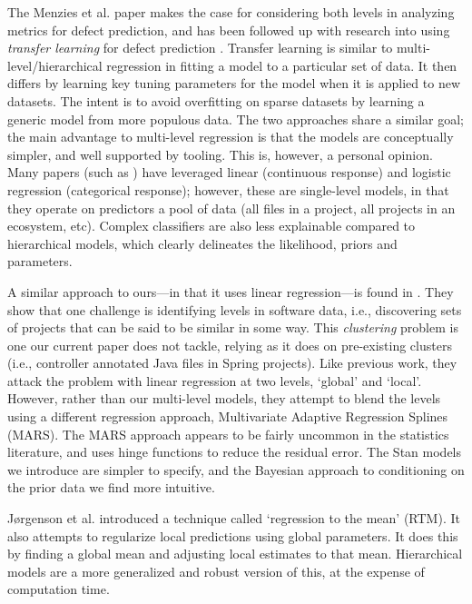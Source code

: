 \documentclass[sigconf,natbib=false]{acmart}
\begin{document}
The Menzies et al. paper makes the case for considering both levels in analyzing metrics for defect prediction, and has been followed up with research into using \emph{transfer learning} for defect prediction \cite{ma2012transfer}. Transfer learning is similar to multi-level/hierarchical regression in fitting a model to a particular set of data. It then differs by learning key tuning parameters for the model when it is applied to new datasets. The intent is to avoid overfitting on sparse datasets by learning a generic model from more populous data. The two approaches share a similar goal; the main advantage to multi-level regression is that the models are conceptually simpler, and well supported by tooling. This is, however, a personal opinion. Many papers (such as \cite{Zhou15regress}) have leveraged linear (continuous response) and logistic regression (categorical response); however, these are single-level models, in that they operate on predictors a pool of data (all files in a project, all projects in an ecosystem, etc). Complex classifiers are also less explainable compared to hierarchical models, which clearly delineates the likelihood, priors and parameters.

A similar approach to ours---in that it uses linear regression---is found in \cite{Bettenburg2012}. They show that one challenge is identifying levels in software data, i.e., discovering sets of projects that can be said to be similar in some way. This \emph{clustering} problem is one our current paper does not tackle, relying as it does on pre-existing clusters (i.e., controller annotated Java files in Spring projects). Like previous work, they attack the problem with linear regression at two levels, `global' and `local'. However, rather than our multi-level models, they attempt to blend the levels using a different regression approach, Multivariate Adaptive Regression Splines (MARS). The MARS approach appears to be fairly uncommon in the statistics literature, and uses hinge functions to reduce the residual error. The Stan models we introduce are simpler to specify, and the Bayesian approach to conditioning on the prior data we find more intuitive.

Jørgenson et al. \cite{JORGENSEN2003} introduced a technique called `regression to the mean' (RTM). It also attempts to regularize local predictions using global parameters. It does this by finding a global mean and adjusting local estimates to that mean. Hierarchical models are a more generalized and robust version of this, at the expense of computation time.
\end{document}

